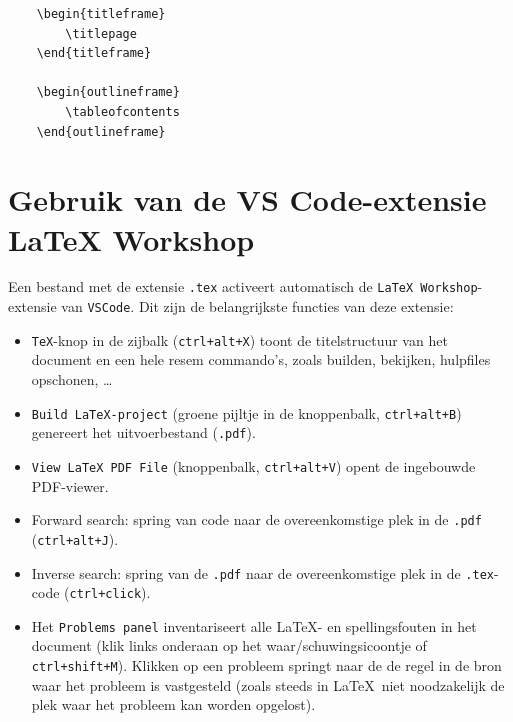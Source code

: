 \documentclass[kulak]{kulakarticle} %
\begin{document}
\begin{verbatim}
	\begin{titleframe}
		\titlepage
	\end{titleframe}
	
	\begin{outlineframe}
		\tableofcontents
	\end{outlineframe}
\end{verbatim}

\section{Gebruik van de VS Code-extensie LaTeX Workshop}
\label{sec:vscode}

Een bestand met de extensie \texttt{.tex} activeert automatisch de \texttt{LaTeX Workshop}-extensie van \texttt{VSCode}. Dit zijn de belangrijkste functies van deze extensie:
\begin{itemize}
	\item \texttt{TeX}-knop in de zijbalk (\texttt{ctrl+alt+X}) toont de titelstructuur van het document en een hele resem commando's, zoals builden, bekijken, hulpfiles opschonen, \ldots
	\item \texttt{Build LaTeX-project} (groene pijltje in de knoppenbalk, \texttt{ctrl+alt+B}) genereert het uitvoerbestand (\texttt{.pdf}).
	\item \texttt{View LaTeX PDF File} (knoppenbalk, \texttt{ctrl+alt+V}) opent de ingebouwde PDF-viewer.
	\item Forward search: spring van code naar de overeenkomstige plek in de \texttt{.pdf} (\texttt{ctrl+alt+J}).
	\item Inverse search: spring van de \texttt{.pdf} naar de overeenkomstige plek in de \texttt{.tex}-code (\texttt{ctrl+click}).
	\item Het \texttt{Problems panel}  inventariseert alle \LaTeX- en spellingsfouten in het document (klik links onderaan op het waar/schuwingsicoontje of \texttt{ctrl+shift+M}). Klikken op een probleem springt naar de de regel in de bron waar het probleem is vastgesteld (zoals steeds in \LaTeX\ niet noodzakelijk de plek waar het probleem kan worden opgelost).
\end{itemize}
\end{document}
